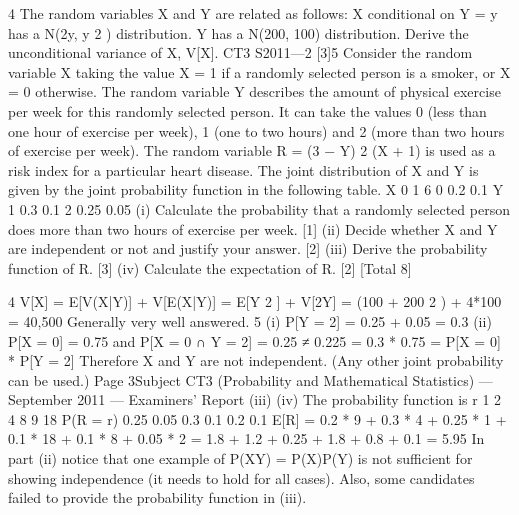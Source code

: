 4
The random variables X and Y are related as follows:
X conditional on Y = y has a N(2y, y 2 ) distribution.
Y has a N(200, 100) distribution.
Derive the unconditional variance of X, V[X].
CT3 S2011—2
[3]5
Consider the random variable X taking the value X = 1 if a randomly selected person
is a smoker, or X = 0 otherwise. The random variable Y describes the amount of
physical exercise per week for this randomly selected person. It can take the values 0
(less than one hour of exercise per week), 1 (one to two hours) and 2 (more than two
hours of exercise per week). The random variable R = (3 − Y) 2 (X + 1) is used as a risk
index for a particular heart disease.
The joint distribution of X and Y is given by the joint probability function in the
following table.
X
0
1
6
0
0.2
0.1
Y
1
0.3
0.1
2
0.25
0.05
(i) Calculate the probability that a randomly selected person does more than two
hours of exercise per week.
[1]
(ii) Decide whether X and Y are independent or not and justify your answer. [2]
(iii) Derive the probability function of R. [3]
(iv) Calculate the expectation of R.
[2]
[Total 8]


4
V[X]
= E[V(X|Y)] + V[E(X|Y)]
= E[Y 2 ] + V[2Y] = (100 + 200 2 ) + 4*100 = 40,500
Generally very well answered.
5
(i) P[Y = 2] = 0.25 + 0.05 = 0.3
(ii) P[X = 0] = 0.75 and
P[{X = 0} ∩ {Y = 2}] = 0.25 ≠ 0.225 = 0.3 * 0.75 = P[X = 0] * P[Y = 2]
Therefore X and Y are not independent.
(Any other joint probability can be used.)
Page 3Subject CT3 (Probability and Mathematical Statistics) — September 2011 — Examiners’ Report
(iii)
(iv)
The probability function is
r 1
2
4
8
9
18
P(R = r) 0.25 0.05 0.3 0.1 0.2 0.1
E[R] = 0.2 * 9 + 0.3 * 4 + 0.25 * 1 + 0.1 * 18 + 0.1 * 8 + 0.05 * 2
= 1.8 + 1.2 + 0.25 + 1.8 + 0.8 + 0.1 = 5.95
In part (ii) notice that one example of P(XY) = P(X)P(Y) is not sufficient for showing
independence (it needs to hold for all cases). Also, some candidates failed to provide the
probability function in (iii).

